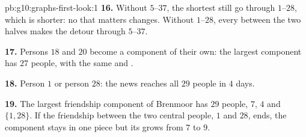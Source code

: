 \begin{solution}{pb:g10:graphs-first-look:1}
\textbf{16.} Without $5$--$37$, the shortest  still go through $1$--$28$, which is shorter: no  that
matters changes. Without $1$--$28$, every  between the two halves makes the detour through $5$--$37$.

\textbf{17.} Persons $18$ and $20$ become a component of their own: the largest component has $27$ people, with the
same  and .

\textbf{18.} Person $1$ or person $28$: the news reaches all $29$ people in $4$ days.

\textbf{19.} The largest friendship component of Brenmoor has $29$ people,  $7$,  $4$ and 
$\{1, 28\}$. If the friendship between the two central people, $1$ and $28$, ends, the component stays in one piece
but its  grows from $7$ to $9$.
\end{solution}
